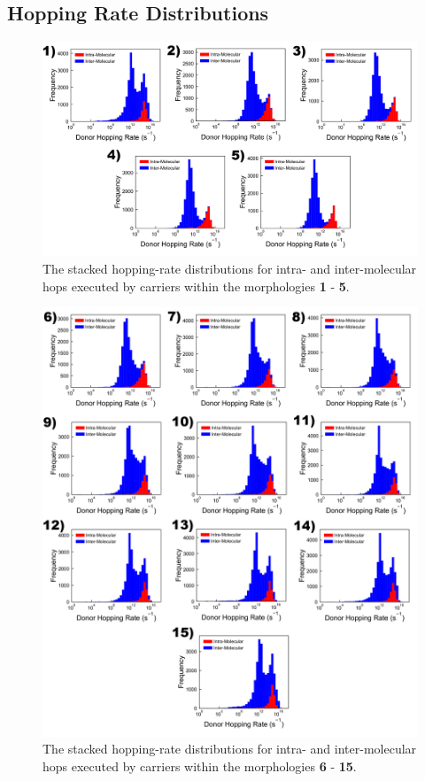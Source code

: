\documentclass[12pt]{article}
\begin{document}
\clearpage
\subsection{Hopping Rate Distributions}

\begin{figure}[h!]\centering
    \includegraphics[width=\textwidth]{Figures/DonorHoppingRateMixed.png}
    \caption{The stacked hopping-rate distributions for intra- and inter-molecular hops executed by carriers within the morphologies \textbf{1} - \textbf{5}.}
	\label{fig:HoppingRateMixed}
\end{figure}

\begin{figure}[h!]\centering
    \includegraphics[width=\textwidth]{Figures/DonorHoppingRateMixedFrame.png}
    \caption{The stacked hopping-rate distributions for intra- and inter-molecular hops executed by carriers within the morphologies \textbf{6} - \textbf{15}.}
	\label{fig:HoppingRateMixedFrame}
\end{figure}
\end{document}
